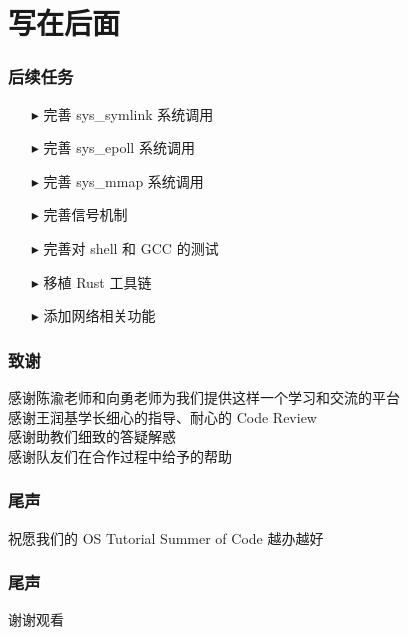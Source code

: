 \documentclass{beamer}
\newcommand{\tri}{$\blacktriangleright$}
\begin{document}
\section{写在后面}
\begin{frame}
	\frametitle{后续任务}
	\begin{itemize}
		\item [\tri] 完善 sys\_symlink 系统调用
		\item [\tri] 完善 sys\_epoll 系统调用
		\item [\tri] 完善 sys\_mmap 系统调用
		\item [\tri] 完善信号机制
		\item [\tri] 完善对 shell 和 GCC 的测试
		\item [\tri] 移植 Rust 工具链
		\item [\tri] 添加网络相关功能
	\end{itemize}
\end{frame}

\begin{frame}
	\frametitle{致谢}
	感谢陈渝老师和向勇老师为我们提供这样一个学习和交流的平台
	\\
	感谢王润基学长细心的指导、耐心的 Code Review
	\\
	感谢助教们细致的答疑解惑
	\\
	感谢队友们在合作过程中给予的帮助
\end{frame}

\begin{frame}
	\frametitle{尾声}
	祝愿我们的 OS Tutorial Summer of Code 越办越好
\end{frame}

\begin{frame}
	\frametitle{尾声}
	谢谢观看
\end{frame}
\end{document}
